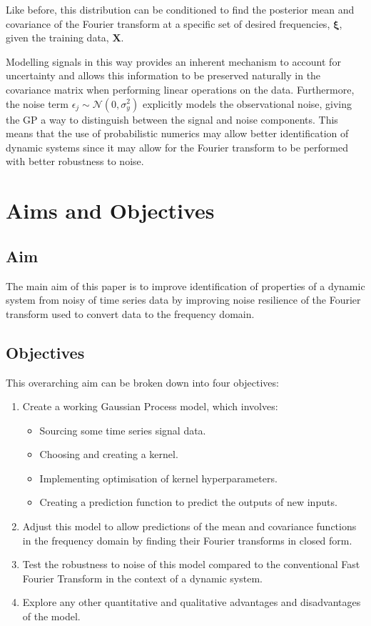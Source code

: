 \documentclass[12pt]{article}
\begin{document}
    Like before, this distribution can be conditioned to find the posterior mean and covariance of the Fourier transform at a specific set of desired frequencies, $\mathbf{\xi}$, given the training data, $\mathbf{X}$.

    Modelling signals in this way provides an inherent mechanism to account for uncertainty and allows this information to be preserved naturally in the covariance matrix when performing linear operations on the data.
    Furthermore, the noise term  $\epsilon_j \sim \mathcal{N}(0, \sigma^2_y)$ explicitly models the observational noise, giving the GP a way to distinguish between the signal and noise components.
    This means that the use of probabilistic numerics may allow better identification of dynamic systems since it may allow for the Fourier transform to be performed with better robustness to noise.

    \section{Aims and Objectives}
    \subsection{Aim}
    The main aim of this paper is to improve identification of properties of a dynamic system from noisy of time series data by improving noise resilience of the Fourier transform used to convert data to the frequency domain.

    \subsection{Objectives}
    This overarching aim can be broken down into four objectives:
        \begin{enumerate}
            \item Create a working Gaussian Process model, which involves:
                \begin{itemize}
                    \item Sourcing some time series signal data.
                    \item Choosing and creating a kernel.
                    \item Implementing optimisation of kernel hyperparameters. \label{item:nll}
                    \item Creating a prediction function to predict the outputs of new inputs. \label{item:predict}
                \end{itemize}
            \item Adjust this model to allow predictions of the mean and covariance functions in the frequency domain by finding their Fourier transforms in closed form. \label{item:FT}
            \item Test the robustness to noise of this model compared to the conventional Fast Fourier Transform in the context of a dynamic system. \label{noise-resilience}
            \item Explore any other quantitative and qualitative advantages and disadvantages of the model.
        \end{enumerate}
\end{document}
